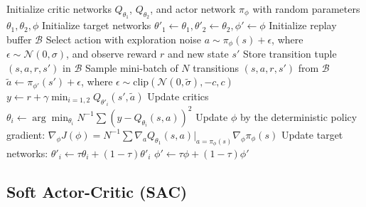 \documentclass{article}
\begin{document}
\begin{algorithm}
\caption{Twin Delayed Deep Deterministic Policy Gradient \citep{fujimoto2018addressing}}
\label{alg:td3}
\begin{algorithmic}[1]
\State Initialize critic networks $Q_{\theta_1}$, $Q_{\theta_2}$, and actor network $\pi_\phi$ with random parameters $\theta_1, \theta_2, \phi$
\State Initialize target networks $\theta'_1 \gets \theta_1, \theta'_2 \gets \theta_2, \phi' \gets \phi$
\State Initialize replay buffer $\mathcal{B}$
    \State Select action with exploration noise $a \sim \pi_\phi(s) + \epsilon$, where $\epsilon \sim \mathcal{N}(0, \sigma)$, and observe reward $r$ and new state $s'$
    \State Store transition tuple $(s, a, r, s')$ in $\mathcal{B}$
    \State Sample mini-batch of $N$ transitions $(s, a, r, s')$ from $\mathcal{B}$
    \State $\tilde{a} \gets \pi_{\phi'}(s') + \epsilon$, where $\epsilon \sim \text{clip}(\mathcal{N}(0, \tilde{\sigma}), -c, c)$
    \State $y \gets r + \gamma \min_{i=1,2} Q_{\theta'_i}(s', \tilde{a})$
    \State Update critics $\theta_i \gets \arg\min_{\theta_i} N^{-1} \sum \left( y - Q_{\theta_i}(s, a) \right)^2$
        \State Update $\phi$ by the deterministic policy gradient:
        \Statex \qquad $\nabla_\phi J(\phi) = N^{-1} \sum \nabla_a Q_{\theta_1}(s, a) \big|_{a=\pi_\phi(s)} \nabla_\phi \pi_\phi(s)$
        \State Update target networks:
        \Statex \qquad $\theta'_i \gets \tau \theta_i + (1 - \tau)\theta'_i$
        \Statex \qquad $\phi' \gets \tau \phi + (1 - \tau)\phi'$
    \EndIf
\EndFor
\end{algorithmic}
\end{algorithm}

\subsection{Soft Actor-Critic (SAC)}
\label{sec:sac}
\end{document}
